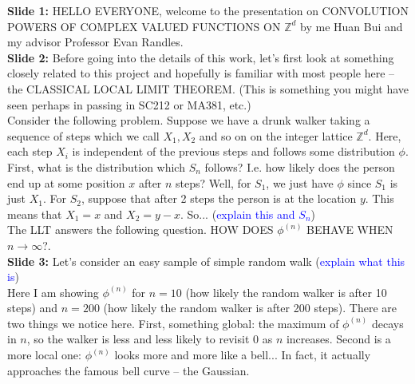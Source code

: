 \documentclass[11pt]{article}
\begin{document}
	
\noindent \textbf{Slide 1:}  HELLO EVERYONE, welcome to the presentation on CONVOLUTION POWERS OF COMPLEX VALUED FUNCTIONS ON $\mathbb{Z}^d$ by me Huan Bui and my advisor Professor Evan Randles.\\



\noindent \textbf{Slide 2:} Before going into the details of this work, let's first look at something closely related to this project and hopefully is familiar with most people here -- the CLASSICAL LOCAL LIMIT THEOREM. (This is something you might have seen perhaps in passing in SC212 or MA381, etc.)\\



Consider the following problem. Suppose we have a drunk walker taking a sequence of steps which we call $X_1, X_2$ and so on on the integer lattice $\mathbb{Z}^d$. Here, each step $X_i$ is independent of the previous steps and follows some distribution $\phi$. \\


First, what is the distribution which $S_n$ follows? I.e. how likely does the person end up at some position $x$ after $n$ steps? Well, for $S_1$, we just have $\phi$ since $S_1$ is just $X_1$. For $S_2$, suppose that after 2 steps the person is at the location $y$. This means that $X_1 = x$ and $X_2 = y-x$. So... (\textcolor{blue}{explain this and $S_n$})\\

The LLT answers the following question. HOW DOES $\phi^{(n)}$ BEHAVE WHEN $n\to \infty$?.\\









\noindent \textbf{Slide 3:} Let's consider an easy sample of simple random walk (\textcolor{blue}{explain what this is})\\




Here I am showing $\phi^{(n)}$ for $n=10$ (how likely the random walker is after 10 steps) and $n=200$ (how likely the random walker is after 200 steps). There are two things we notice here. First, something global: the maximum of $\phi^{(n)}$ decays in $n$, so the walker is less and less likely to revisit 0 as $n$ increases. Second is a more local one: $\phi^{(n)}$ looks more and more like a bell... In fact, it actually approaches the famous bell curve -- the Gaussian. \\
\end{document}
